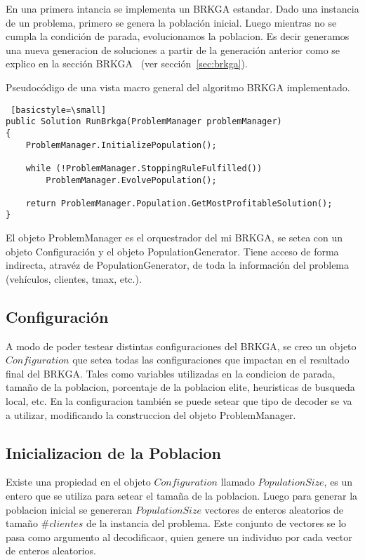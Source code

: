 En una primera intancia se implementa un BRKGA estandar. Dado una instancia de un problema, primero se genera la población inicial. Luego mientras no se cumpla la condición de parada, evolucionamos la poblacion. Es decir generamos una nueva generacion de soluciones a partir de la generación anterior como se explico en la sección BRKGA ~(ver sección~\ref{sec:brkga}).

\bigskip

Pseudocódigo de una vista macro general del algoritmo BRKGA implementado.

\bigskip

\begin{lstlisting} [basicstyle=\small]
public Solution RunBrkga(ProblemManager problemManager)
{
    ProblemManager.InitializePopulation();

    while (!ProblemManager.StoppingRuleFulfilled())
        ProblemManager.EvolvePopulation();

    return ProblemManager.Population.GetMostProfitableSolution();
}
\end{lstlisting}

\bigskip

El objeto ProblemManager es el orquestrador del mi BRKGA, se setea con un objeto Configuración y el objeto PopulationGenerator. Tiene acceso de forma indirecta, atravéz de PopulationGenerator, de toda la información del problema (vehículos, clientes, tmax, etc.).

\subsection{Configuración}

A modo de poder testear distintas configuraciones del BRKGA, se creo un objeto $Configuration$ que setea todas las configuraciones que impactan en el resultado final del BRKGA. Tales como variables utilizadas en la condicion de parada, tamaño de la poblacion, porcentaje de la poblacion elite, heuristicas de busqueda local, etc. En la configuracion también se puede setear que tipo de decoder se va a utilizar, modificando la construccion del objeto ProblemManager.

\subsection{Inicializacion de la Poblacion}

Existe una propiedad en el objeto $Configuration$ llamado $PopulationSize$, es un entero que se utiliza para setear el tamaña de la poblacion. Luego para generar la poblacion inicial se genereran $PopulationSize$ vectores de enteros aleatorios de tamaño $\#clientes$ de la instancia del problema. Este conjunto de vectores se lo pasa como argumento al decodificaor, quien genere un individuo por cada vector de enteros aleatorios.

